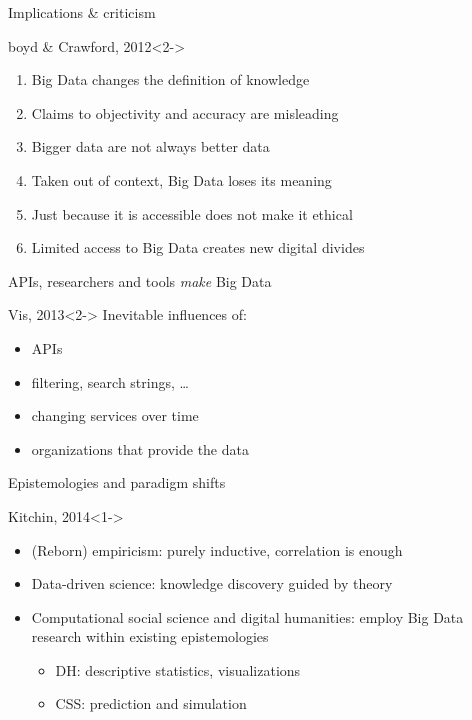 \documentclass{beamer}
\begin{document}
\begin{frame}{Implications \& criticism}
\begin{block}{boyd \& Crawford, 2012}<2->
\begin{enumerate}
\item Big Data changes the definition of knowledge
\item Claims to objectivity and accuracy are misleading
\item Bigger data are not always better data
\item Taken out of context, Big Data loses its meaning
\item Just because it is accessible does not make it ethical
\item Limited access to Big Data creates new digital divides
\end{enumerate}
\end{block}
\end{frame}


\begin{frame}{APIs, researchers and tools \emph{make} Big Data}
\begin{block}{Vis, 2013}<2->
Inevitable influences of:
\begin{itemize}
\item APIs
\item filtering, search strings, \ldots
\item changing services over time
\item organizations that provide the data
\end{itemize}
\end{block}
\end{frame}


\begin{frame}{Epistemologies and paradigm shifts}
\begin{block}{Kitchin, 2014}<1->
\begin{itemize}
\item<2-> (Reborn) empiricism: purely inductive, correlation is enough
\item<3-> Data-driven science: knowledge discovery guided by theory
\item<4-> Computational social science and digital humanities: employ Big Data research within existing epistemologies
\begin{itemize}
\item DH: descriptive statistics, visualizations
\item CSS: prediction and simulation
\end{itemize}
\end{itemize}
\end{block}
\end{frame}
\end{document}
